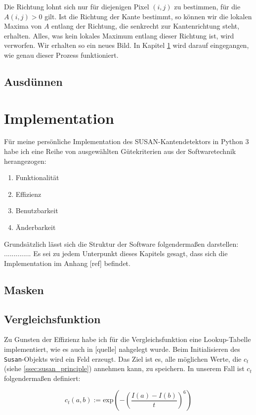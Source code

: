 \documentclass[a4paper, 11pt]{report}
\theoremstyle{definition}
\begin{document}
			Die Richtung lohnt sich nur für diejenigen Pixel $(i,j)$ zu bestimmen, für die $A(i,j) > 0$ gilt. Ist die Richtung der Kante bestimmt, so können wir die lokalen Maxima von $A$ entlang der Richtung, die senkrecht zur Kantenrichtung steht, erhalten. Alles, was kein lokales Maximum entlang dieser Richtung ist, wird verworfen. Wir erhalten so ein neues Bild. In Kapitel \ref{sec:implementation} wird darauf eingegangen, wie genau dieser Prozess funktioniert.


		\subsection{Ausdünnen}


		\section{Implementation}\label{sec:implementation}
		Für meine persönliche Implementation des SUSAN-Kantendetektors in Python 3 habe ich eine Reihe von ausgewählten Gütekriterien aus der Softwaretechnik herangezogen:
			\begin{enumerate}
				\item Funktionalität
				\item Effizienz
				\item Benutzbarkeit
				\item Änderbarkeit
			\end{enumerate}
		Grundsätzlich lässt sich die Struktur der Software folgendermaßen darstellen: ..............
		Es sei zu jedem Unterpunkt dieses Kapitels gesagt, dass sich die Implementation im Anhang [ref] befindet.
		
		\subsection{Masken}


		\subsection{Vergleichsfunktion}
			Zu Gunsten der Effizienz habe ich für die Vergleichsfunktion eine Lookup-Tabelle implementiert, wie es auch in [quelle] nahgelegt wurde. Beim Initialisieren des \texttt{Susan}-Objekts wird ein Feld erzeugt. Das Ziel ist es, alle möglichen Werte, die $c_t$ (siehe \ref{ssec:susan_principle}) annehmen kann, zu speichern.
			In unserem Fall ist $c_t$ folgendermaßen definiert:
			
			$$
				c_t(a,b) :=
					\text{exp}\left(-\left(\frac{I(a) - I(b)}{t}\right)^6\right)
			$$
			
\end{document}
